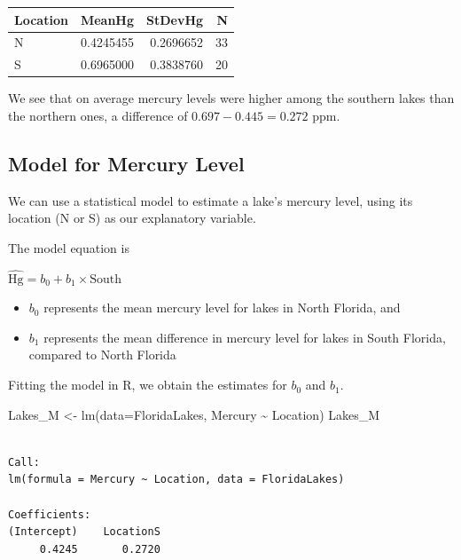 \documentclass[
  letterpaper,
  DIV=11,
  numbers=noendperiod]{scrreprt}
\newenvironment{Shaded}{\begin{snugshade}}{\end{snugshade}}
\newcommand{\AttributeTok}[1]{\textcolor[rgb]{0.40,0.45,0.13}{#1}}
\newcommand{\FunctionTok}[1]{\textcolor[rgb]{0.28,0.35,0.67}{#1}}
\newcommand{\NormalTok}[1]{\textcolor[rgb]{0.00,0.23,0.31}{#1}}
\newcommand{\OtherTok}[1]{\textcolor[rgb]{0.00,0.23,0.31}{#1}}
\newcommand{\SpecialCharTok}[1]{\textcolor[rgb]{0.37,0.37,0.37}{#1}}
\providecommand{\tightlist}{%
  \setlength{\itemsep}{0pt}\setlength{\parskip}{0pt}}\usepackage{longtable,booktabs,array}
\begin{document}
\begin{longtable}[]{@{}lrrr@{}}
\toprule\noalign{}
Location & MeanHg & StDevHg & N \\
\midrule\noalign{}
\endhead
\bottomrule\noalign{}
\endlastfoot
N & 0.4245455 & 0.2696652 & 33 \\
S & 0.6965000 & 0.3838760 & 20 \\
\end{longtable}

We see that on average mercury levels were higher among the southern
lakes than the northern ones, a difference of \(0.697-0.445= 0.272\)
ppm.

\subsection{Model for Mercury Level}\label{model-for-mercury-level}

We can use a statistical model to estimate a lake's mercury level, using
its location (N or S) as our explanatory variable.

The model equation is

\(\widehat{\text{Hg}} = b_0 +b_1\times\text{South}\)

\begin{itemize}
\tightlist
\item
  \(b_0\) represents the mean mercury level for lakes in North Florida,
  and\\
\item
  \(b_1\) represents the mean difference in mercury level for lakes in
  South Florida, compared to North Florida
\end{itemize}

Fitting the model in R, we obtain the estimates for \(b_0\) and \(b_1\).

\begin{Shaded}
\begin{Highlighting}[]
\NormalTok{Lakes\_M }\OtherTok{\textless{}{-}} \FunctionTok{lm}\NormalTok{(}\AttributeTok{data=}\NormalTok{FloridaLakes, Mercury }\SpecialCharTok{\textasciitilde{}}\NormalTok{ Location)}
\NormalTok{Lakes\_M}
\end{Highlighting}
\end{Shaded}

\begin{verbatim}

Call:
lm(formula = Mercury ~ Location, data = FloridaLakes)

Coefficients:
(Intercept)    LocationS  
     0.4245       0.2720  
\end{verbatim}
\end{document}
